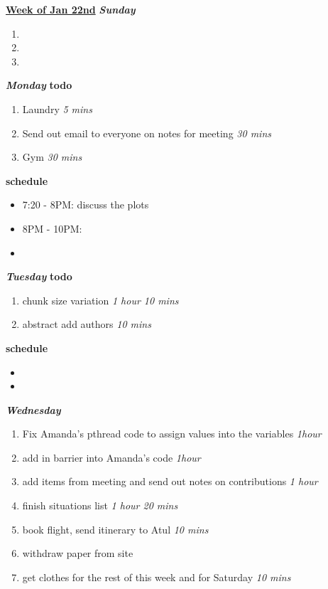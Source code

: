 \documentclass[11pt]{article}
\newcommand{\timeEst}[1]{\textit{#1}}
\begin{document}
\underline{\textbf{Week of Jan 22nd}}
\textbf{\textit{Sunday}}
\begin{enumerate}
\item
\item
\item
\end{enumerate}

\textbf{\textit{Monday}}
\textbf{todo}
\begin{enumerate}
\item Laundry \timeEst{5 mins}
\item Send out email to everyone on notes for meeting \timeEst{30
mins}
\item Gym \timeEst{30 mins}
\end{enumerate}

\textbf{schedule}
\begin{itemize}
\item 7:20 - 8PM: discuss the plots
\item 8PM - 10PM:
\item
\end{itemize}

\textbf{\textit{Tuesday}}
\textbf{todo}
\begin{enumerate}
\item chunk size variation \timeEst{1 hour 10 mins}
\item abstract add authors \timeEst{ 10 mins}
\end{enumerate}

\textbf{schedule}
\begin{itemize}
\item
\item
\end{itemize}

\textbf{\textit{Wednesday}}
\begin{enumerate}
\item Fix Amanda's pthread code to assign values into the
variables \timeEst{1hour}
\item add in barrier into Amanda's code \timeEst{1hour}
\item add items from meeting and send out notes on contributions \timeEst{1 hour}
\item finish situations list \timeEst{1 hour 20 mins}
\item book flight, send itinerary to Atul  \timeEst{ 10 mins}
\item withdraw paper from site
\item get clothes for the rest of this week and for Saturday \timeEst{10 mins}
\end{enumerate}
\end{document}
